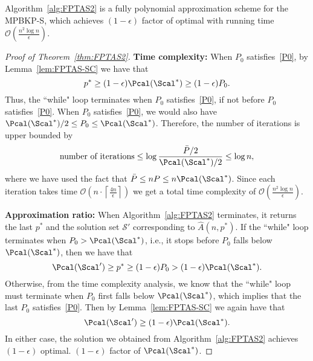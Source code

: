 \begin{theorem}\label{thm:FPTAS2}
	Algorithm~\ref{alg:FPTAS2} is a fully polynomial approximation scheme for the MPBKP-S, which achieves $(1-\epsilon)$ factor of optimal with running time $\mathcal{O}\left(\frac{n^2\log n}{\epsilon}\right)$.
\end{theorem}
\begin{proof}[Proof of Theorem~\ref{thm:FPTAS2}]
	{\bf Time complexity: }
	When $P_0$ satisfies~\eqref{P0}, by Lemma~\ref{lem:FPTAS-SC} we have that
	$$
	p^*\ge (1-\epsilon) \Pcal(\Scal^*)\ge (1-\epsilon)P_0.
	$$
	Thus, the ``while" loop terminates when $P_0$ satisfies~\eqref{P0}, if not before $P_0$ satisfies~\eqref{P0}. When $P_0$ satisfies~\eqref{P0}, we would also have $\Pcal(\Scal^*)/2\le P_0\le \Pcal(\Scal^*)$. Therefore, the number of iterations is upper bounded by
	$$
	\text{number of iterations}\le \log\frac{\bar{P}/2}{\Pcal(\Scal^*)/2}\le \log n,
	$$
	where we have used the fact that $\bar{P}\le nP\le n\Pcal(\Scal^*)$. Since each iteration takes time $\mathcal{O}\left(n\cdot \left\lceil\frac{4n}{\epsilon}\right\rceil \right)$ we get a total time complexity of $\mathcal{O}\left(\frac{n^2\log n}{\epsilon}\right)$.
	
	{\bf Approximation ratio:} 
	When Algorithm~\ref{alg:FPTAS2} terminates, it returns the last $p^*$ and the solution set $\mathcal{S}'$ corresponding to $\hat{A}(n,p^*)$.
	If the ``while" loop terminates when $P_0>\Pcal(\Scal^*)$, i.e., it stops before $P_0$ falls below $\Pcal(\Scal^*)$, then we have that
	$$
	\Pcal(\Scal')\ge p^*\ge (1-\epsilon)P_0>(1-\epsilon)\Pcal(\Scal^*).
	$$
	Otherwise, from the time complexity analysis, we know that the ``while" loop must terminate when $P_0$ first falls below $\Pcal(\Scal^*)$, which implies that the last $P_0$ satisfies~\eqref{P0}. Then by Lemma~\ref{lem:FPTAS-SC} we again have that 
	$$
	\Pcal(\Scal')\ge (1-\epsilon)\Pcal(\Scal^*).
	$$
	In either case, the solution we obtained from Algorithm~\ref{alg:FPTAS2} achieves $(1-\epsilon)$ optimal.
	$(1-\epsilon)$ factor of $\Pcal(\Scal^*)$. 
\end{proof}